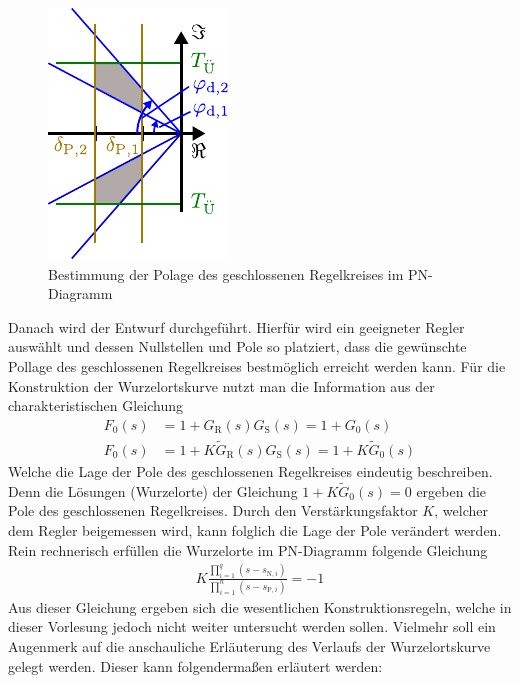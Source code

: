 \begin{figure}[h]
	\centering
	\includegraphics[width=0.3\linewidth]{Abbildungen/Reglerentwurf/PDF/PNEntwurf.pdf}
	\caption{Bestimmung der Polage des geschlossenen Regelkreises im PN-Diagramm}
	\label{fig:WurzelEntwurf}
\end{figure}
%
Danach wird der Entwurf durchgeführt. Hierfür wird ein geeigneter Regler auswählt und dessen Nullstellen und Pole so platziert, dass die gewünschte Pollage des geschlossenen Regelkreises bestmöglich erreicht werden kann. Für die Konstruktion der Wurzelortskurve nutzt man die Information aus der charakteristischen Gleichung
%
\begin{equation*}
\begin{aligned}
%
F_{0}(s)&=1+G_{\text{R}}(s)G_{\text{S}}(s)=1+G_{0}(s)\\
%
F_{0}(s)&=1+K\tilde{G}_{\text{R}}(s)G_{\text{S}}(s)=1+K\tilde{G}_{0}(s)
%
\end{aligned}
\end{equation*}
%
Welche die Lage der Pole des geschlossenen Regelkreises eindeutig beschreiben. Denn die Lösungen (Wurzelorte) der Gleichung $1+K\tilde{G}_{0}(s)=0$ ergeben die Pole des geschlossenen Regelkreises. Durch den Verstärkungsfaktor $K$, welcher dem Regler beigemessen wird, kann folglich die Lage der Pole verändert werden. Rein rechnerisch erfüllen die Wurzelorte im PN-Diagramm folgende Gleichung
%
\begin{equation*}
\begin{aligned}
%
K\frac{\prod_{i=1}^{q}\left(s-s_{\text{N},i}\right)}{\prod_{i=1}^{n}\left(s-s_{\text{P},i}\right)}=-1
%
\end{aligned}
\end{equation*}
%
Aus dieser Gleichung ergeben sich die wesentlichen Konstruktionsregeln, welche in dieser Vorlesung jedoch nicht weiter untersucht werden sollen. Vielmehr soll ein Augenmerk auf die anschauliche Erläuterung des Verlaufs der Wurzelortskurve gelegt werden. Dieser kann folgendermaßen erläutert werden:
